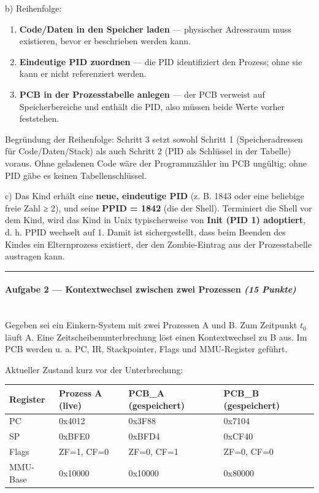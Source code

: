 \documentclass[11pt, a4paper]{article}
\begin{document}
b) Reihenfolge:

\begin{enumerate}
  \item \textbf{Code/Daten in den Speicher laden} — physischer Adressraum muss existieren, bevor er beschrieben werden kann.
  \item \textbf{Eindeutige PID zuordnen} — die PID identifiziert den Prozess; ohne sie kann er nicht referenziert werden.
  \item \textbf{PCB in der Prozesstabelle anlegen} — der PCB verweist auf Speicherbereiche und enthält die PID, also müssen beide Werte vorher feststehen.
\end{enumerate}

Begründung der Reihenfolge: Schritt 3 setzt sowohl Schritt 1 (Speicheradressen für Code/Daten/Stack) als auch Schritt 2 (PID als Schlüssel in der Tabelle) voraus. Ohne geladenen Code wäre der Programmzähler im PCB ungültig; ohne PID gäbe es keinen Tabellenschlüssel.


c) Das Kind erhält eine \textbf{neue, eindeutige PID} (z. B. 1843 oder eine beliebige freie Zahl ≥ 2), und seine \textbf{PPID = 1842} (die der Shell). Terminiert die Shell vor dem Kind, wird das Kind in Unix typischerweise von \textbf{Init (PID 1) adoptiert}, d. h. PPID wechselt auf 1. Damit ist sichergestellt, dass beim Beenden des Kindes ein Elternprozess existiert, der den Zombie-Eintrag aus der Prozesstabelle austragen kann.



\noindent\textcolor{rulegray}{\rule{\linewidth}{0.4pt}}


\paragraph{Aufgabe 2 — Kontextwechsel zwischen zwei Prozessen \textit{(15 Punkte)}}\mbox{}\\[2pt]

Gegeben sei ein Einkern-System mit zwei Prozessen A und B. Zum Zeitpunkt $t_0$ läuft A. Eine Zeitscheibenunterbrechung löst einen Kontextwechsel zu B aus. Im PCB werden u. a. PC, IR, Stackpointer, Flags und MMU-Register geführt.


Aktueller Zustand kurz vor der Unterbrechung:



{\small
\begin{tabularx}{\linewidth}{XXXX}
\hline
\rowcolor{tableheadbg}
{\color{white}\textbf{Register}} & {\color{white}\textbf{Prozess A (live)}} & {\color{white}\textbf{PCB\_A (gespeichert)}} & {\color{white}\textbf{PCB\_B (gespeichert)}} \\[2pt]
\hline
\endhead
\hline
\endfoot
PC & 0x4012 & 0x3F88 & 0x7104 \\
SP & 0xBFE0 & 0xBFD4 & 0xCF40 \\
Flags & ZF=1, CF=0 & ZF=0, CF=1 & ZF=0, CF=0 \\
MMU-Base & 0x10000 & 0x10000 & 0x80000 \\
\end{tabularx}
}
\end{document}
